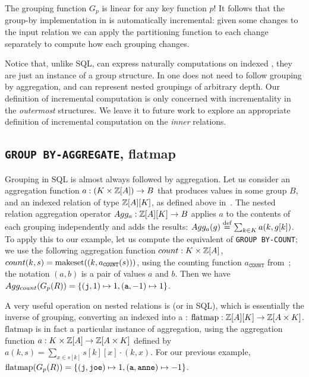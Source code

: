 The grouping function $G_p$ is linear for any key function $p$!
It follows that the group-by implementation in \dbsp is automatically
incremental: given some changes
to the input relation we can apply the partitioning function
to each change separately to compute how each grouping changes.

Notice that, unlike SQL, \dbsp can express naturally computations
on indexed \zrs, they are just an instance of a group structure. 
In \dbsp one does not need to follow
grouping by aggregation, and \dbsp can represent nested groupings
of arbitrary depth.  Our definition of incremental 
computation is only concerned with incrementality in the 
\emph{outermost} structures.  We leave it to future work to
explore an appropriate definition of incremental computation 
on the \emph{inner} relations.


\subsection{\texttt{GROUP BY-AGGREGATE}, flatmap}

Grouping in SQL is almost always followed by aggregation.  
Let us consider an aggregation function $a: (K \times \mathbb{Z}[A]) \to B$ that produces values
in some group $B$, and an indexed relation of type $\mathbb{Z}[A][K]$, as defined above in~.
The nested relation aggregation operator $Agg_a: \mathbb{Z}[A][K] \to B$ applies $a$ 
to the contents of each grouping independently and adds the results:
$Agg_a(g) \stackrel{\textrm{\scriptsize def}}{=} \sum_{k \in K} a(k, g[k])$.  To apply this
to our example, let us compute the equivalent of \texttt{GROUP BY-COUNT}; we use
the following aggregation function $count: K \times \mathbb{Z}[A]$, $count(k, s) = 
\mbox{makeset}((k, a_\texttt{COUNT}(s)))$, using the \zr counting function $a_\texttt{COUNT}$ 
from~; the notation $(a,b)$ is a pair of values $a$ and $b$.
Then we have $Agg_{count} (G_p(R)) = \{ (\mbox{\texttt{j}}, 1) \mapsto 1, 
(\mbox{\texttt{a}}, -1) \mapsto 1 \}$.


A very useful operation on nested relations is  (or  in SQL), which is
essentially the inverse of grouping, converting an indexed
\zr into a \zr: $\mbox{flatmap}: \mathbb{Z}[A][K] \to \mathbb{Z}[A \times K]$.
$\mbox{flatmap}$ is in fact a particular instance of aggregation,
using the aggregation function $a: K \times \mathbb{Z}[A] \to \mathbb{Z}[A \times K]$
defined by $a(k, s) = \sum_{x \in s[k]} s[k][x] \cdot (k, x).$
For our previous example, $\mbox{flatmap}(G_p(R)) = \{ (\mbox{\texttt{j}}, \mbox{\texttt{joe}}) \mapsto 1, 
(\mbox{\texttt{a}}, \mbox{\texttt{anne}}) \mapsto -1 \}$.

